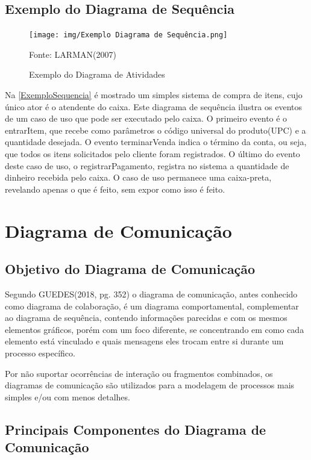 \documentclass[12pt,openright,oneside,a4paper,
	chapter=TITLE,
	section=TITLE,
	english,brazil]{abntex2}
\begin{document}
\section{Exemplo do Diagrama de Sequência}

\begin{figure}[!htp]
	\caption{Exemplo do Diagrama de Atividades}
	\centering
	\texttt{[image: img/Exemplo Diagrama de Sequência.png]}
	\\

	\label{ExemploSequencia}
	\footnotesize\raggedright Fonte: LARMAN(2007)
\end{figure}

Na \autoref{ExemploSequencia} é mostrado um simples sistema de compra de itens, cujo único ator é o atendente do caixa. Este diagrama de sequência ilustra os eventos de um caso de uso que pode ser executado pelo caixa. O primeiro evento é o entrarItem, que recebe como parâmetros o código universal do produto(UPC) e a quantidade desejada. O evento terminarVenda indica o término da conta, ou seja, que todos os itens solicitados pelo cliente foram registrados. O último do evento deste caso de uso, o registrarPagamento, registra no sistema a quantidade de dinheiro recebida pelo caixa.  O caso de uso permanece uma caixa-preta, revelando apenas o que é feito, sem expor como isso é feito.

\chapter{Diagrama de Comunicação}

\section{Objetivo do Diagrama de Comunicação}
Segundo GUEDES(2018, pg. 352) o diagrama de comunicação, antes conhecido como diagrama de colaboração, é um diagrama comportamental, complementar ao diagrama de sequência, contendo informações parecidas e com os mesmos elementos gráficos, porém com um foco diferente, se concentrando em como cada elemento está vinculado e quais mensagens eles trocam entre si durante um processo específico.

Por não suportar ocorrências de interação ou fragmentos combinados, os diagramas de comunicação são utilizados para a modelagem de processos mais simples e/ou com menos detalhes.

\section{Principais Componentes do Diagrama de Comunicação}
\end{document}
